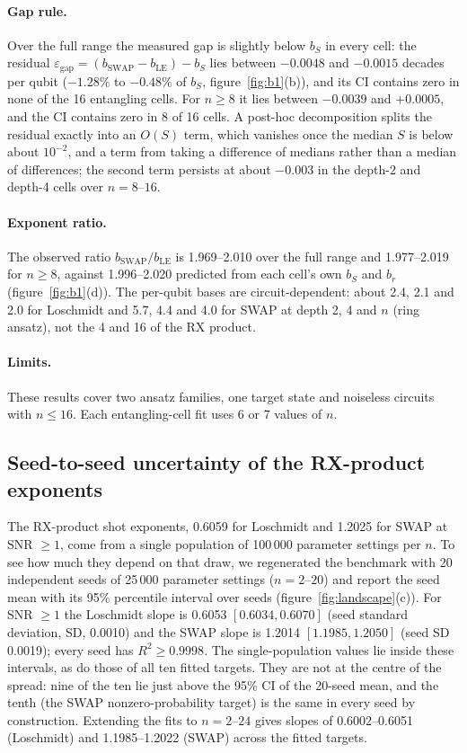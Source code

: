 \paragraph{Gap rule.} Over the full range the measured gap is slightly below $b_S$ in every cell: the residual
$\varepsilon_{\mathrm{gap}} = (b_{\mathrm{SWAP}} - b_{\mathrm{LE}}) - b_S$ lies between $-0.0048$ and $-0.0015$
decades per qubit ($-1.28\%$ to $-0.48\%$ of $b_S$, figure~\ref{fig:b1}(b)), and its CI contains zero in none of the
16 entangling cells. For $n \ge 8$ it lies between $-0.0039$ and $+0.0005$, and the CI contains zero in 8 of 16 cells.
A post-hoc decomposition splits the residual exactly into an $O(S)$ term, which vanishes once the median $S$ is
below about $10^{-2}$, and a term from taking a difference of medians rather than a median of differences; the second
term persists at about $-0.003$ in the depth-2 and depth-4 cells over $n = 8$--$16$.

\paragraph{Exponent ratio.} The observed ratio $b_{\mathrm{SWAP}}/b_{\mathrm{LE}}$ is 1.969--2.010 over the full
range and 1.977--2.019 for $n \ge 8$, against 1.996--2.020 predicted from each cell's own $b_S$ and $b_r$
(figure~\ref{fig:b1}(d)). The per-qubit bases are circuit-dependent: about 2.4, 2.1 and 2.0 for Loschmidt and 5.7,
4.4 and 4.0 for SWAP at depth 2, 4 and $n$ (ring ansatz), not the 4 and 16 of the RX product.

\paragraph{Limits.} These results cover two ansatz families, one target state and noiseless circuits with
$n \le 16$. Each entangling-cell fit uses 6 or 7 values of $n$.

\subsection{Seed-to-seed uncertainty of the RX-product exponents}
\label{sec:results-b3}

The RX-product shot exponents, 0.6059 for Loschmidt and 1.2025 for SWAP at SNR $\ge 1$, come from a single population
of 100\,000 parameter settings per $n$. To see how much they depend on that draw, we regenerated the benchmark with 20
independent seeds of 25\,000 parameter settings ($n = 2$--$20$) and
report the seed mean with its 95\% percentile interval over seeds (figure~\ref{fig:landscape}(c)). For SNR $\ge 1$ the
Loschmidt slope is 0.6053 $[0.6034, 0.6070]$ (seed standard deviation, SD, 0.0010) and the SWAP slope is 1.2014 $[1.1985, 1.2050]$
(seed SD 0.0019); every seed has $R^2 \ge 0.9998$. The single-population values lie inside these intervals, as do
those of all ten fitted targets. They are not at the centre of the spread: nine of the ten lie just
above the 95\% CI of the 20-seed mean, and the tenth (the SWAP nonzero-probability target) is the same in every seed
by construction. Extending the fits to $n = 2$--$24$ gives slopes of
0.6002--0.6051 (Loschmidt) and 1.1985--1.2022 (SWAP) across the fitted targets.

